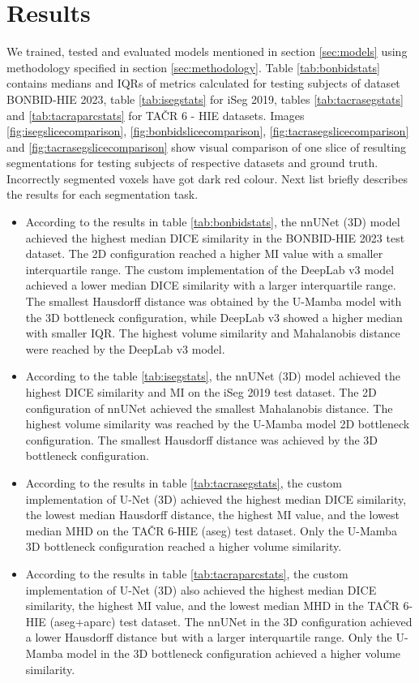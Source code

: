 \documentclass[runningheads]{llncs}
\begin{document}
\section{Results}
We trained, tested and evaluated models mentioned in section \ref{sec:models} using methodology specified in section \ref{sec:methodology}. Table \ref{tab:bonbidstats} contains medians and IQRs of metrics calculated for testing subjects of dataset BONBID-HIE 2023, table \ref{tab:isegstats} for iSeg 2019, tables \ref{tab:tacrasegstats} and \ref{tab:tacraparcstats} for TAČR 6 - HIE datasets. Images \ref{fig:isegslicecomparison}, \ref{fig:bonbidslicecomparison}, \ref{fig:tacrasegslicecomparison} and \ref{fig:tacrasegslicecomparison} show visual comparison of one slice of resulting segmentations for testing subjects of respective datasets and ground truth. Incorrectly segmented voxels have got dark red colour. Next list briefly describes the results for each segmentation task.

\begin{itemize}
\item According to the results in table \ref{tab:bonbidstats}, the nnUNet (3D) model achieved the highest median DICE similarity in the BONBID-HIE 2023 test dataset. The 2D configuration reached a higher MI value with a smaller interquartile range. The custom implementation of the DeepLab v3 model achieved a lower median DICE similarity with a larger interquartile range. The smallest Hausdorff distance was obtained by the U-Mamba model with the 3D bottleneck configuration, while DeepLab v3 showed a higher median with smaller IQR. The highest volume similarity and Mahalanobis distance were reached by the DeepLab v3 model.

\item According to the table \ref{tab:isegstats}, the nnUNet (3D) model achieved the highest DICE similarity and MI on the iSeg 2019 test dataset. The 2D configuration of nnUNet achieved the smallest Mahalanobis distance. The highest volume similarity was reached by the U-Mamba model 2D bottleneck configuration. The smallest Hausdorff distance was achieved by the 3D bottleneck configuration. 

\item According to the results in table \ref{tab:tacrasegstats}, the custom implementation of U-Net (3D) achieved the highest median DICE similarity, the lowest median Hausdorff distance, the highest MI value, and the lowest median MHD on the TAČR 6-HIE (aseg) test dataset. Only the U-Mamba 3D bottleneck configuration reached a higher volume similarity. 

\item According to the results in table \ref{tab:tacraparcstats}, the custom implementation of U-Net (3D) also achieved the highest median DICE similarity, the highest MI value, and the lowest median MHD in the TAČR 6-HIE (aseg+aparc) test dataset. The nnUNet in the 3D configuration achieved a lower Hausdorff distance but with a larger interquartile range. Only the U-Mamba model in the 3D bottleneck configuration achieved a higher volume similarity.
\end{itemize}
\end{document}
